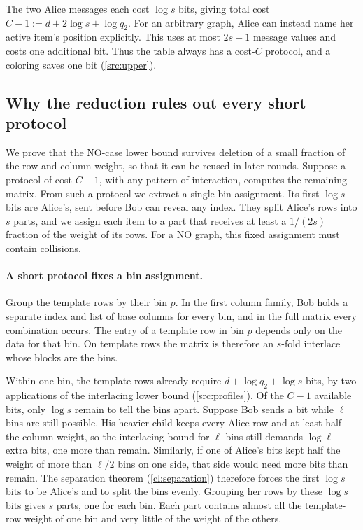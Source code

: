 \documentclass[11pt,letterpaper]{article} \usepackage[utf8]{inputenc}
\theoremstyle{plain} \newtheorem{theorem}{Theorem}[section]
\theoremstyle{definition} \newaliascnt{definition}{theorem}
\begin{document}
The two Alice messages each cost $\log s$ bits, giving total cost
$C-1:=d+2\log s+\log q_2$. For an arbitrary graph, Alice can instead name
her active item's position explicitly. This uses at most $2s-1$ message
values and costs one additional bit. Thus the table always has a
cost-$C$ protocol, and a coloring saves one bit
(\cref{src:upper}).

\subsection{Why the reduction rules out every short protocol}

We prove that the NO-case lower bound survives deletion of a small fraction
of the row and column weight, so that it can be reused in later rounds.
Suppose a protocol of cost $C-1$, with any pattern of interaction, computes
the remaining matrix. From such a protocol we
extract a single bin assignment. Its first $\log s$ bits are Alice's,
sent before Bob can reveal any index. They split Alice's rows into $s$
parts, and we assign each item to a part that receives at least a
$1/(2s)$ fraction of the weight of its rows. For a NO graph, this fixed assignment must contain
collisions.

\paragraph{A short protocol fixes a bin assignment.}
Group the template rows by their bin $p$. In the first column family,
Bob holds a separate index and list of base columns for every bin,
and in the full matrix every combination occurs. The entry of a template row in bin $p$ depends only
on the data for that bin. On template rows the matrix is therefore an
$s$-fold interlace whose blocks are the bins.

Within one bin, the template rows already require
$d+\log q_2+\log s$ bits, by two applications of the interlacing lower
bound (\cref{src:profiles}). Of the $C-1$ available bits, only $\log s$
remain to tell the bins apart.
Suppose Bob sends a bit while $\ell$ bins are still possible. His heavier
child keeps every Alice row and at least half the column weight, so the interlacing
bound for $\ell$ bins still demands $\log \ell$ extra bits,
one more than remain. Similarly, if one of Alice's bits kept half the
weight of more than $\ell/2$ bins on one side, that side would need more bits
than remain. The
separation theorem (\cref{cl:separation}) therefore forces the first
$\log s$ bits to be Alice's and to split the bins evenly. Grouping her rows
by these $\log s$ bits gives $s$ parts, one for each bin. Each part contains almost all the template-row weight of one bin
and very little of the weight of the others.
\end{document}
